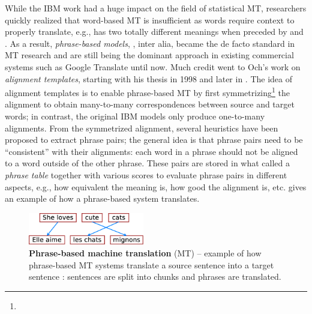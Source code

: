 {While the IBM work had a huge impact on the field of statistical MT, researchers
quickly realized that word-based MT is insufficient as words
require context to properly translate, e.g.,  has two totally different
meanings when preceded by  and . As a result,
{\it phrase-based models}, \cite{Marcu:2002,Zens2002,Koehn:2003:SMT}, inter alia, became the de facto
standard in MT research and are still being the dominant approach in existing
commercial systems such as Google Translate until now. Much credit went to Och's
work on {\it alignment templates}, starting with his thesis in 1998 and later in
\cite{och03,och04}. The idea of alignment templates is to enable phrase-based MT
by first symmetrizing\footnote{} the alignment to obtain many-to-many correspondences
between source and target words; in contrast, the original IBM models only produce
one-to-many alignments. From the symmetrized alignment, several heuristics have
been proposed to extract phrase pairs; the general idea is that phrase
pairs need to be ``consistent'' with their alignments: each word in a phrase
should not be aligned to a word outside of the other phrase. These pairs are stored
in what called a {\it phrase table} together with various scores to evaluate
phrase pairs in different aspects, e.g., how equivalent the meaning is, how good
the alignment is, etc.  gives an example of how a
phrase-based system translates.
}

\begin{figure}[tbh!]
\centering
\includegraphics[width=0.45\textwidth, clip=true, trim= 0 0 0
0]{img/phrasemt.eps} %
\caption[Phrase-based machine translation]{{\bf Phrase-based machine translation} (MT) -- example of how phrase-based
MT systems translate a source sentence  into a target sentence
: sentences are split into chunks and phrases
are translated.
} 
\label{f:phrase_mt}
\end{figure}

